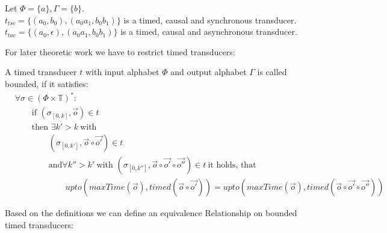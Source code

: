 \begin{exmp}[name=Timed Transducers]
  Let \(\Phi = \{a\}, \Gamma = \{b\}\).\\
  \(t_{tsc} = \{(a_0, b_0),(a_0a_1, b_0b_1)\}\) is a timed, causal and synchronous transducer.\\
  \(t_{tac} = \{(a_0, \epsilon),(a_0a_1, b_0b_1)\}\) is a timed, causal and asynchronous transducer.
\end{exmp}


For later theoretic work we have to restrict timed transducers:

\begin{definition}[name = Boundedness of Timed Transducers]\label{def:boundedness_timed_transducer}
  A timed transducer \(t\) with input alphabet \(\Phi\) and output alphabet \(\Gamma\) is called bounded, if it satisfies:
  \begin{align*}
    &\forall \sigma \in {(\Phi \times \mathbb{T})}^*:\\
    &\hspace{2em}\text{if } (\sigma_{[0,k]}, \vec{o}) \in t\\
    &\hspace{2em}\text{then }\exists k' > k\ \text{with}\\
    &\hspace{4em}(\sigma_{[0,k']}, \vec{o} \circ \vec{o'}) \in t\\
    &\hspace{4em}\text{and} \forall k'' > k'\ \text{with } (\sigma_{[0,k'']}, \vec{o}\circ\vec{o'}\circ\vec{o''}) \in t\ \text{it holds, that}\\
    &\hspace{6em}\mathit{upto}(\mathit{maxTime}(\vec{o}), \mathit{timed}(\vec{o}\circ\vec{o'})) = \mathit{upto}(\mathit{maxTime}(\vec{o}), \mathit{timed}(\vec{o}\circ\vec{o'}\circ\vec{o''}))
  \end{align*}
\end{definition}

Based on the definitions we can define an equivalence Relationship on bounded timed transducers:

